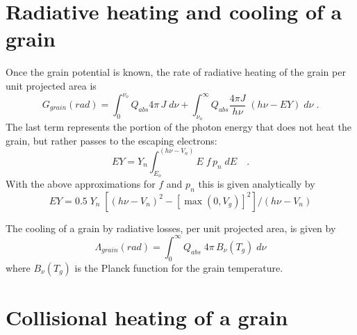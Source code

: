 \section{Radiative heating and cooling of a grain}

Once the grain potential is known, the rate of radiative heating of the
grain per unit projected area is
\begin{equation}
{G_{grain}}(rad) = \int_0^{{\nu _o}} {{Q_{abs}}4\pi \,J\;d\nu  + \int_{{\nu
_o}}^\infty  {{Q_{abs}}\frac{{4\pi J}}{{h\nu }}\;\left( {h\nu  - EY} \right)}
} \;d\nu \;.
\end{equation}
The last term represents the portion of the photon energy that does not
heat the grain, but rather passes to the escaping electrons:
\begin{equation}
EY = {Y_n}\int_{{E_o}}^{\left( {h\nu  - {V_n}} \right)}
{E\;f\,{p_n}\;dE\quad .}
\end{equation}
With the above approximations for $f$ and $p_n$ this is given analytically by
\begin{equation}
EY = 0.5\;{Y_n}\;\left[ {{{\left( {h\nu  - {V_n}} \right)}^2} - {{[\max
(0,{V_g})]}^2}} \right]/\left( {h\nu  - {V_n}} \right)
\end{equation}

The cooling of a grain by radiative losses, per unit projected area,
is given by
\begin{equation}
{\Lambda _{grain}}\left( {rad} \right) = \int_0^\infty  {{Q_{abs}}\;4\pi
\,{B_\nu }\left( {{T_g}} \right)\;d\nu }
\end{equation}
where $B_\nu(T_g)$ is the Planck function for the grain temperature.

\section{Collisional heating of a grain}


